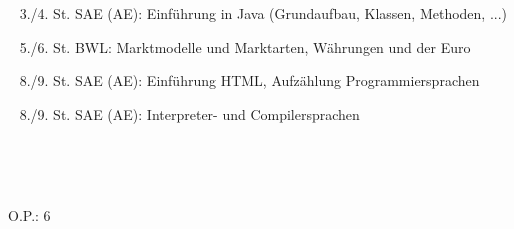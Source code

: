 {{	\textbullet~ 3./4. St. SAE (AE): Einführung in Java (Grundaufbau, Klassen, Methoden, ...)\par
	\textbullet~ 5./6. St. BWL: Marktmodelle und Marktarten, Währungen und der Euro\par
	\textbullet~ 8./9. St. SAE (AE): Einführung HTML, Aufzählung Programmiersprachen\par
	\textbullet~ 8./9. St. SAE (AE): Interpreter- und Compilersprachen\par
	\textbullet~ \par
	\textbullet~ 
	}{}{O.P.: 6}
}{}
\Unterschrift
\newpage

